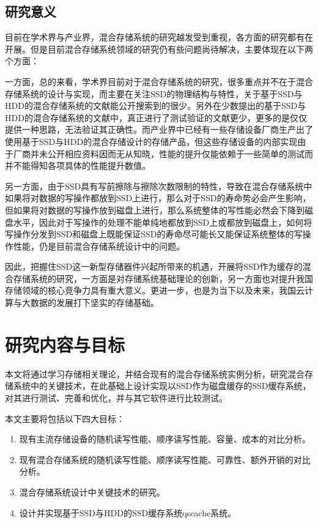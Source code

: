 \subsection{研究意义}

目前在学术界与产业界，混合存储系统的研究越发受到重视，各方面的研究都有在开展。但是目前混合存储系统领域的研究仍有些问题尚待解决，主要体现在以下两个方面：

一方面，总的来看，学术界目前对于混合存储系统的研究，很多重点并不在于混合存储系统的设计与实现，而主要在关注SSD的物理结构与特性，关于基于SSD与HDD的混合存储系统的文献\cite{guerra2011cost, kim2011hybridstore, 杨濮源2012一种时间敏感的, 陈震37基于磁盘和固态硬盘的混合存储系统研究综述}能公开搜索到的很少。另外在少数提出的基于SSD与HDD的混合存储系统的文献中，真正进行了测试验证的文献更少，更多的是仅仅提供一种思路，无法验证其正确性。而产业界中已经有一些存储设备厂商生产出了使用基于SSD与HDD的混合存储设计的存储产品，但这些存储设备的内部实现由于厂商并未公开相应资料因而无从知晓，性能的提升仅能依赖于一些简单的测试而并不能得知各项具体的性能提升数值。

另一方面，由于SSD具有写前擦除与擦除次数限制的特性，导致在混合存储系统中如果将对数据的写操作都放到SSD上进行，那么对于SSD的寿命势必会产生影响，但如果将对数据的写操作放到磁盘上进行，那么系统整体的写性能必然会下降到磁盘水平，因此对于写操作的处理不能单纯地都放到SSD上或都放到磁盘上，如何将写操作分发到SSD和磁盘上既能保证SSD的寿命尽可能长又能保证系统整体的写操作性能，仍是目前混合存储系统设计中的问题。

因此，把握住SSD这一新型存储器件兴起所带来的机遇，开展将SSD作为缓存的混合存储系统的研究，一方面是对存储系统基础理论的创新，另一方面也对提升我国存储领域的核心竞争力具有重大意义。更进一步，也是为当下以及未来，我国云计算与大数据的发展打下坚实的存储基础。

\section{研究内容与目标}

本文将通过学习存储相关理论，并结合现有的混合存储系统实例分析，研究混合存储系统中的关键技术，在此基础上设计实现以SSD作为磁盘缓存的SSD缓存系统，对其进行测试、完善和优化，并与其它软件进行比较测试。

本文主要将包括以下四大目标：
\begin{enumerate}[leftmargin=0pt, itemindent=39pt]
    \item 现有主流存储设备的随机读写性能、顺序读写性能、容量、成本的对比分析。
    \item 现有混合存储系统的随机读写性能、顺序读写性能、可靠性、额外开销的对比分析。
    \item 混合存储系统设计中关键技术的研究。
    \item 设计并实现基于SSD与HDD的SSD缓存系统qscache系统。
\end{enumerate}


